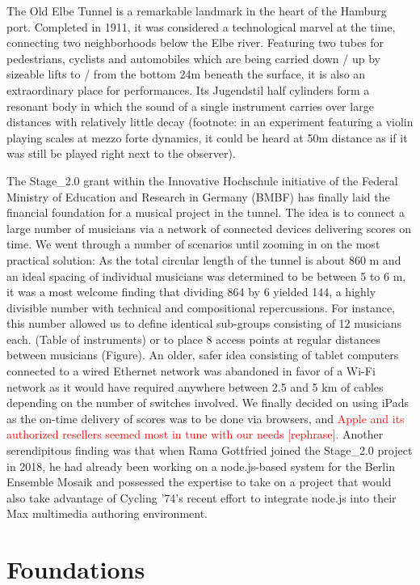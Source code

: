 The Old Elbe Tunnel is a remarkable landmark in the heart of the Hamburg port. Completed in 1911, it was considered a technological marvel at the time, connecting two neighborhoods below the Elbe river. Featuring two tubes for pedestrians, cyclists and automobiles which are being carried down / up by sizeable lifts to / from the bottom 24m beneath the surface, it is also an extraordinary place for performances. Its Jugendstil half cylinders form a resonant body in which the sound of a single instrument carries over large distances with relatively little decay (footnote: in an experiment featuring a violin playing scales at mezzo forte dynamics, it could be heard at 50m distance as if it was still be played right next to the observer).

The Stage\_2.0 grant within the Innovative Hochschule initiative of the Federal Ministry of Education and Research in Germany (BMBF) has finally laid the financial foundation for a musical project in the tunnel. The idea is to connect a large number of musicians via a network of connected devices delivering scores on time. We went through a number of scenarios until zooming in on the most practical solution: As the total circular length of the tunnel is about 860 m and an ideal spacing of individual musicians was determined to be between 5 to 6 m, it was a most welcome finding that dividing 864 by 6 yielded 144, a highly divisible number with technical and compositional repercussions. For instance, this number allowed us to define identical sub-groups consisting of 12 musicians each. (Table of instruments) or to place 8 access points at regular distances between musicians (Figure). An older, safer idea consisting of tablet computers connected to a wired Ethernet network was abandoned in favor of a Wi-Fi network as it would have required anywhere between 2.5 and 5 km of cables depending on the number of switches involved. 
We finally decided on using iPads as the on-time delivery of scores was to be done via browsers, and \textcolor{red}{Apple and its authorized resellers seemed most in tune with our needs [rephrase]. }
Another serendipitous finding was that when Rama Gottfried joined the Stage\_2.0 project in 2018, he had already been working on a node.js-based system for the Berlin Ensemble Mosaik and possessed the expertise to take on a project that would also take advantage of Cycling ’74’s recent effort to integrate node.js into their Max multimedia authoring environment.




\section{Foundations} \label{sec:foundations} 
%
%  
%
%



